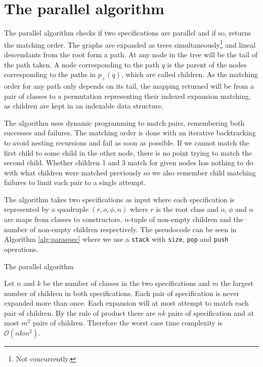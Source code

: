 \section{The parallel algorithm}
The parallel algorithm checks if two specifications are parallel and if so, returns the matching order. The graphs are expanded as trees simultaneously\footnote{Not concurrently.} and lineal descendants from the root form a path. At any node in the tree will be the tail of the path taken. A node corresponding to the path $q$ is the parent of the nodes corresponding to the paths in $p_+(q)$, which are called children. As the matching order for any path only depends on its tail, the mapping returned will be from a pair of classes to a permutation representing their indexed expansion matching, as children are kept in an indexable data structure.

The algorithm uses dynamic programming to match pairs, remembering both successes and failures. The matching order is done with an iterative backtracking to avoid nesting recursions and fail as soon as possible. If we cannot match the first child to some child in the other node, there is no point trying to match the second child. Whether children 1 and 3 match for given nodes has nothing to do with what children were matched previously so we also remember child matching failures to limit each pair to a single attempt.

The algorithm takes two specifications as input where each specification is represented by a quadruple $(r,o,\phi,n)$ where $r$ is the root class and $o$, $\phi$ and $n$ are maps from classes to constructors, $n$-tuple of non-empty children and the number of non-empty children respectively. The pseudocode can be seen in Algorithm \ref{alg:paraspec} where we use a \texttt{stack} with \texttt{size}, \texttt{pop} and \texttt{push} operations. 

\begin{algorithm}

\caption{The parallel algorithm}
\label{alg:paraspec}
\end{algorithm}

Let $n$ and $k$ be the number of classes in the two specifications and $m$ the largest number of children in both specifications. Each pair of specification is never expanded more than once. Each expansion will at most attempt to match each pair of children. By the rule of product there are $nk$ pairs of specification and at most $m^2$ pairs of children. Therefore the worst case time complexity is $\mathcal{O}(nkm^2)$.